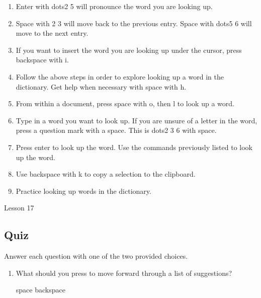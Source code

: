 \documentclass[10pt,letterpaper,twoside]{report}
\begin{document}
{{{{\begin{enumerate}
	\item Enter with dots2 5 will pronounce the word you are looking up.
	      
	\item Space with 2 3 will move back to the previous entry.  Space with dots5 6 will move to the next entry.
	      
	\item If you want to insert the word you are looking up under the cursor, press backspace with i.
	      
	\item Follow the above steps in order to explore looking up a word in the dictionary.  Get help when necessary with space with h.
	      
	\item From within a document, press space with o, then l to look up a word.
	      
	\item Type in a word you want to look up.  If you are unsure of a letter in the word, press a question mark with a space.  This is dots2 3 6 with space.
	      
	\item Press enter to look up the word.  Use the commands previously listed to look up the word.
	      
	\item Use backspace with k to copy a selection to the clipboard.
	      
	\item Practice looking up words in the dictionary.
\end{enumerate}





\clearpage

\newpage
Lesson 17

\subsection{Quiz}



Answer each question with one of the two provided choices.



\begin{enumerate}
	\item What should you press to move forward through a list of suggestions?
	      
	      space  backspace
	      
	      
	      

\end{enumerate}}}}}
\end{document}

